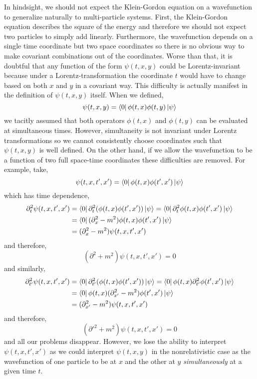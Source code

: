 \documentclass[12pt]{extarticle}
\begin{document}
In hindsight, we should not expect the Klein-Gordon equation on a wavefunction to generalize naturally to multi-particle systems. First, the Klein-Gordon equation describes the square of the energy and therefore we should not expect two particles to simply add linearly. Furthermore, the wavefunction depends on a single time coordinate but two space coordinates so there is no obvious way to make covariant combinations out of the coordinates. Worse than that, it is doubtful that any function of the form $\psi(t, x, y)$ could be Lorentz-invariant because under a Lorentz-transformation the coordinate $t$ would have to change based on both $x$ and $y$ in a covariant way. This difficulty is actually manifest in the definition of $\psi(t, x, y)$ itself. When we defined, 
\[ \psi(t, x, y) = \left< 0 \right| \phi(t, x) \phi(t, y) \left| \psi \right> \]
we tacitly assumed that both operators $\phi(t, x)$ and $\phi(t, y)$ can be evaluated at simultaneous times. However, simultaneity is not invariant under Lorentz transformations so we cannot consistently choose coordinates such that $\psi(t, x, y)$ is well defined. On the other hand, if we allow the wavefunction to be a function of two full space-time coordinates these difficulties are removed. For example, take,
\[ \psi(t, x, t',  x') = \left< 0 \right| \phi(t, x) \phi(t', x') \left| \psi \right> \]
which has time dependence,    
\begin{align*}
\partial_t^2 \psi(t, x, t', x') & = \left< 0 \right| \partial_t^2  (\phi(t, x) \phi(t', x')) \left| \psi \right> = \left< 0 \right|  \partial_t^2 \phi(t, x) \phi(t', x') \left| \psi \right>
\\
& = \left< 0 \right|  (\partial_x^2 - m^2) \phi(t, x) \phi(t', x') \left| \psi \right> 
\\
& = (\partial_x^2 - m^2) \psi(t, x, t', x')
\end{align*}
and therefore,
\[(\partial^2 + m^2) \psi(t, x, t', x') = 0\]
and similarly,
\begin{align*}
\partial_{t'}^2 \psi(t, x, t', x') & = \left< 0 \right| \partial_{t'}^2  (\phi(t, x) \phi(t', x')) \left| \psi \right> = \left< 0 \right| \phi(t, x)  \partial_{t'}^2 \phi(t', x') \left| \psi \right>
\\
& = \left< 0 \right| \phi(t, x) (\partial_{x'}^2 - m^2) \phi(t', x') \left| \psi \right> 
\\
& = (\partial_{x'}^2 - m^2) \psi(t, x, t', x')
\end{align*}
and therefore,
\[(\partial'^2 + m^2) \psi(t, x, t', x') = 0\]
and all our problems disappear. However, we lose the ability to interpret $\psi(t, x, t', x')$ as we could interpret $\psi(t, x, y)$ in the nonrelativistic case as the wavefunction of one particle to be at $x$ and the other at $y$ \textit{simultaneously} at a given time $t$. 
\end{document}

